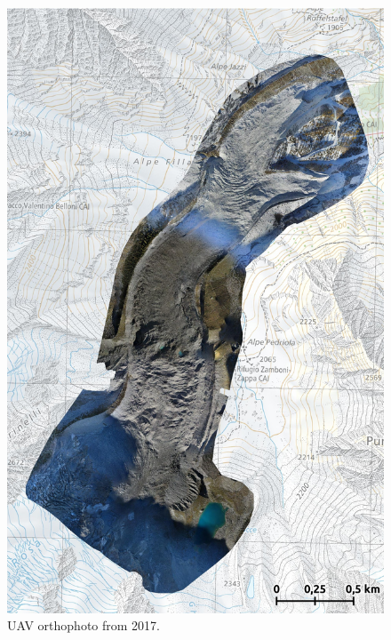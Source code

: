 \begin{figure}[p]
    \centering
    \includegraphics[height=\textheight]{figures/appendix/orto_2017.jpg}
    \caption[]{UAV orthophoto from 2017.}
\end{figure}

